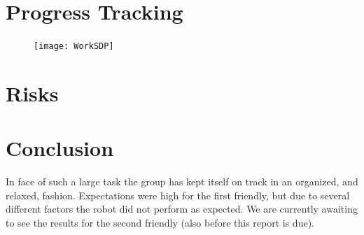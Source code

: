 \documentclass[a4paper,12pt]{article}
\begin{document}
\section{Progress Tracking}


\begin{figure}[H]
    \centering
    \texttt{[image: WorkSDP]}
    \label{fig:diagram}
\end{figure}
	\vfill

\section{Risks}


\section{Conclusion}
In face of such a large task the group has kept itself on track in an organized, and relaxed, fashion. Expectations were high for the first friendly, but due to several different factors the robot did not perform as expected. We are currently awaiting to see the results for the second friendly (also before this report is due).
\end{document}
